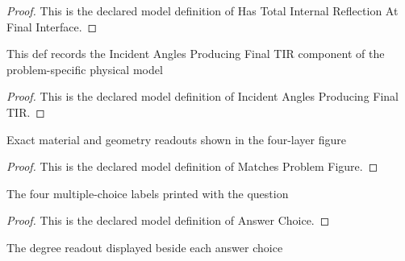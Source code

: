 \begin{proof}
  This is the declared model definition of Has Total Internal Reflection At Final Interface.
\end{proof}
\begin{definition}
  \label{def:physics:phyx-mini-0021:phyxminiproblems-problemphyxmini0021-incidentanglesproducingfinaltir}
  This def records the Incident Angles Producing Final TIR component of the problem-specific physical model
\end{definition}
\begin{proof}
  This is the declared model definition of Incident Angles Producing Final TIR.
\end{proof}
\begin{definition}
  \label{def:physics:phyx-mini-0021:phyxminiproblems-problemphyxmini0021-matchesproblemfigure}
  Exact material and geometry readouts shown in the four-layer figure
\end{definition}
\begin{proof}
  This is the declared model definition of Matches Problem Figure.
\end{proof}
\begin{definition}
  \label{def:physics:phyx-mini-0021:phyxminiproblems-problemphyxmini0021-answerchoice}
  The four multiple-choice labels printed with the question
\end{definition}
\begin{proof}
  This is the declared model definition of Answer Choice.
\end{proof}
\begin{definition}
  \label{def:physics:phyx-mini-0021:phyxminiproblems-problemphyxmini0021-answerangledegrees}
  The degree readout displayed beside each answer choice
\end{definition}
